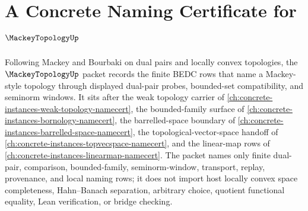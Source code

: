 \chapter{A Concrete Naming Certificate for $\MackeyTopologyUp$}
\label{ch:concrete-instances-mackey-topology-namecert}

Following Mackey and Bourbaki on dual pairs and locally convex topologies, the $\MackeyTopologyUp$ packet records the finite BEDC rows that name a Mackey-style topology through displayed dual-pair probes, bounded-set compatibility, and seminorm windows. It sits after the weak topology carrier of \autoref{ch:concrete-instances-weak-topology-namecert}, the bounded-family surface of \autoref{ch:concrete-instances-bornology-namecert}, the barrelled-space boundary of \autoref{ch:concrete-instances-barrelled-space-namecert}, the topological-vector-space handoff of \autoref{ch:concrete-instances-topvecspace-namecert}, and the linear-map rows of \autoref{ch:concrete-instances-linearmap-namecert}. The packet names only finite dual-pair, comparison, bounded-family, seminorm-window, transport, replay, provenance, and local naming rows; it does not import host locally convex space completeness, Hahn--Banach separation, arbitrary choice, quotient functional equality, Lean verification, or bridge checking.

